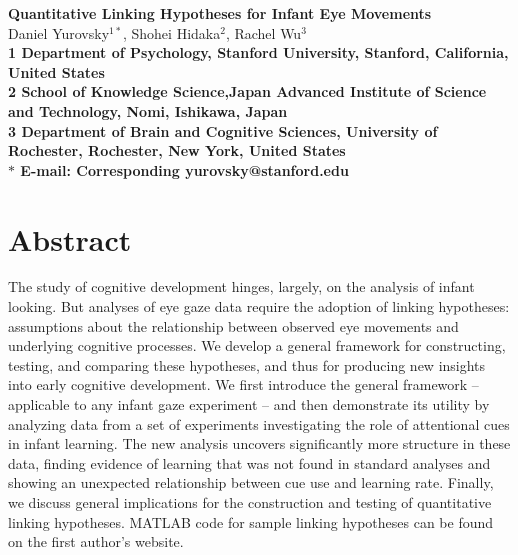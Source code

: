 \documentclass[12pt]{article}
\date{}
\begin{document}
\begin{flushleft}
{\Large
\textbf{Quantitative Linking Hypotheses for Infant Eye Movements}
}
\\
Daniel Yurovsky$^{1\ast}$, 
Shohei Hidaka$^{2}$, 
Rachel Wu$^{3}$
\\
\bf{1} Department of Psychology, Stanford University, Stanford, California, United States
\\
\bf{2} School of Knowledge Science,Japan Advanced Institute of Science and Technology, Nomi, Ishikawa, Japan
\\
\bf{3} Department of Brain and Cognitive Sciences, University of Rochester, Rochester, New York, United States
\\
$\ast$ E-mail: Corresponding yurovsky@stanford.edu
\end{flushleft}

\section*{Abstract}
The study of cognitive development hinges, largely, on the analysis of infant looking. But analyses of eye gaze data require the adoption of linking hypotheses: assumptions about the relationship between observed eye movements and underlying cognitive processes. We develop a general framework for constructing, testing, and comparing these hypotheses, and thus for producing new insights into early cognitive development. We first introduce the general framework -- applicable to any infant gaze experiment -- and then demonstrate its utility by analyzing data from a set of experiments investigating the role of attentional cues in infant learning. The new analysis uncovers significantly more structure in these data, finding evidence of learning that was not found in standard analyses and showing an unexpected relationship between cue use and learning rate. Finally, we discuss general implications for the construction and testing of quantitative linking hypotheses. MATLAB code for sample linking hypotheses can be found on the first author's website.

\end{document}
